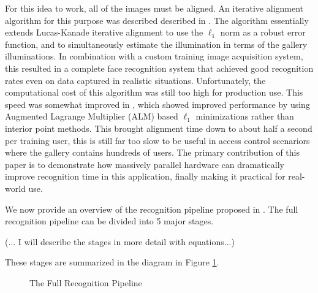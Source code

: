 \documentclass[10pt,twocolumn,letterpaper]{article}
\begin{document}
For this idea to work, all of the images must be aligned. An iterative
alignment algorithm for this purpose was described described in
\cite{Wagner2009-CVPR}.  The algorithm essentially extends Lucas-Kanade
iterative alignment to use the $\ell_1$ norm as a robust error function, and to
simultaneously estimate the illumination in terms of the gallery illuminations.
In combination with a custom training image acquisition system, this resulted
in a complete face recognition system that achieved good recognition rates even
on data captured in realistic situations.  Unfortunately, the computational
cost of this algorithm was still too high for production use.  This speed was
somewhat improved in \cite{Wagner2010-PAMI}, which showed improved performance
by using Augmented Lagrange Multiplier (ALM) based $\ell_1$ minimizations
rather than interior point methods.  This brought alignment time down to about
half a second per training user, this is still far too slow to be useful in
access control scenariors where the gallery contains hundreds of users.
The primary contribution of this paper is to demonstrate how massively
parallel hardware can dramatically improve recognition time in this application,
finally making it practical for real-world use.

We now provide an overview of the recognition pipeline proposed 
in \cite{Wagner2010-PAMI}.  The full recognition pipeline can be divided into 5 major stages.

(... I will describe the stages in more detail with equations...)

These stages are summarized in the diagram in Figure \ref{fig:pipeline}.


\begin{figure}
\centering
{\tiny }
\caption{The Full Recognition Pipeline}
\label{fig:pipeline}
\end{figure}
\end{document}
